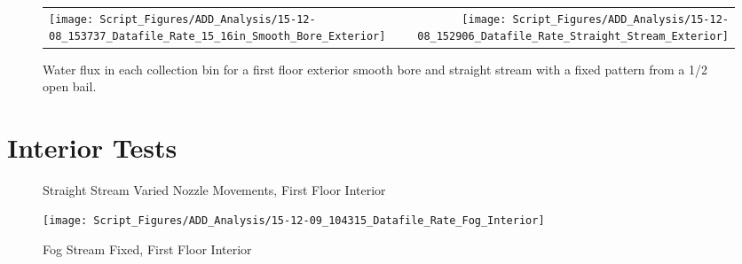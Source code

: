 \documentclass[12pt,oneside]{book}
\begin{document}
\begin{figure}[ht]
\begin{tabular*}{\textwidth}{lr}
\texttt{[image: Script\_Figures/ADD\_Analysis/15-12-08\_153737\_Datafile\_Rate\_15\_16in\_Smooth\_Bore\_Exterior]} & 
\texttt{[image: Script\_Figures/ADD\_Analysis/15-12-08\_152906\_Datafile\_Rate\_Straight\_Stream\_Exterior]} \\
\end{tabular*}
\caption{Water flux in each collection bin for a first floor exterior smooth bore and straight stream with a fixed pattern from a 1/2 open bail.}
\label{fig:SB_SS_Exterior_First_Floor_Half_Bail}
\end{figure}

\clearpage

\section{Interior Tests}

\begin{figure}[ht]
\centering
{}
\caption{Straight Stream Varied Nozzle Movements, First Floor Interior}
\label{fig:Straight Stream Varied Nozzle Movements, First Floor Interior}
\end{figure}

\begin{figure}[ht]
\centering
\texttt{[image: Script\_Figures/ADD\_Analysis/15-12-09\_104315\_Datafile\_Rate\_Fog\_Interior]} \\
\caption{Fog Stream Fixed, First Floor Interior}
\label{fig:Fog Stream Fixed, First Floor Interior}
\end{figure}
\end{document}

